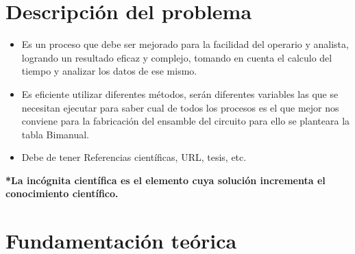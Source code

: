     \section{Descripción del problema}
    \begin{itemize}
        \item Es un proceso que debe ser mejorado para la facilidad del operario y analista, logrando un resultado eficaz y complejo, tomando en cuenta el calculo del tiempo y analizar los datos de ese mismo.
        \item Es eficiente utilizar diferentes métodos, serán diferentes variables las que se necesitan ejecutar para saber cual de todos los procesos es el que mejor nos conviene para la fabricación del ensamble del circuito para ello se planteara la tabla Bimanual. 
        \item Debe de tener Referencias científicas, URL, tesis, etc.
    \end{itemize}
    
    \textbf{*La incógnita científica es el elemento cuya solución incrementa el conocimiento científico.}
    \section{Fundamentación teórica}
    
